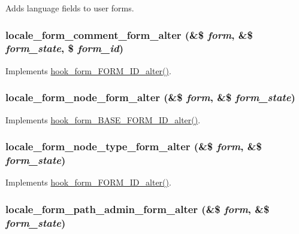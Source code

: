 Adds language fields to user forms. \hypertarget{locale_8module_a0c89767f4334a1f943812abe06911fc8}{
\subsubsection[{locale\_\-form\_\-comment\_\-form\_\-alter}]{\setlength{\rightskip}{0pt plus 5cm}locale\_\-form\_\-comment\_\-form\_\-alter (\&\$ {\em form}, \/  \&\$ {\em form\_\-state}, \/  \$ {\em form\_\-id})}}
\label{locale_8module_a0c89767f4334a1f943812abe06911fc8}
Implements \hyperlink{group__hooks_ga8d4a4089551493d55911bd5c4f218264}{hook\_\-form\_\-FORM\_\-ID\_\-alter()}. \hypertarget{locale_8module_aa806a49c688743813db9cc4df8e3bc59}{
\subsubsection[{locale\_\-form\_\-node\_\-form\_\-alter}]{\setlength{\rightskip}{0pt plus 5cm}locale\_\-form\_\-node\_\-form\_\-alter (\&\$ {\em form}, \/  \&\$ {\em form\_\-state})}}
\label{locale_8module_aa806a49c688743813db9cc4df8e3bc59}
Implements \hyperlink{group__hooks_gaf0cfc224a88c8823da68856c30a4841a}{hook\_\-form\_\-BASE\_\-FORM\_\-ID\_\-alter()}. \hypertarget{locale_8module_a8dae6578c4a2c3bc70f60ec85e874161}{
\subsubsection[{locale\_\-form\_\-node\_\-type\_\-form\_\-alter}]{\setlength{\rightskip}{0pt plus 5cm}locale\_\-form\_\-node\_\-type\_\-form\_\-alter (\&\$ {\em form}, \/  \&\$ {\em form\_\-state})}}
\label{locale_8module_a8dae6578c4a2c3bc70f60ec85e874161}
Implements \hyperlink{group__hooks_ga8d4a4089551493d55911bd5c4f218264}{hook\_\-form\_\-FORM\_\-ID\_\-alter()}. \hypertarget{locale_8module_aa97391a9803f665e0c9be02ce4d3b5dd}{
\subsubsection[{locale\_\-form\_\-path\_\-admin\_\-form\_\-alter}]{\setlength{\rightskip}{0pt plus 5cm}locale\_\-form\_\-path\_\-admin\_\-form\_\-alter (\&\$ {\em form}, \/  \&\$ {\em form\_\-state})}}
